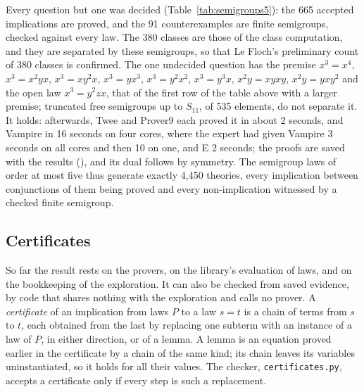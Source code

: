 \documentclass[11pt,a4paper]{article}
\theoremstyle{definition}
\theoremstyle{remark}
\newcommand{\code}[1]{\texttt{#1}}
\begin{document}
Every question but one was decided (Table~\ref{tab:semigroups5}): the 665 accepted implications are proved, and the 91 counterexamples are finite semigroups, checked against every law. The 380 classes are those of the class computation, and they are separated by these semigroups, so that Le Floch's preliminary count of 380 classes is confirmed. The one undecided question has the premise $x^3 = x^4$, $x^3 = x^2yx$, $x^3 = xy^2x$, $x^3 = yx^3$, $x^3 = y^2x^2$, $x^3 = y^3x$, $x^2y = xyxy$, $x^2y = yxy^2$ and the open law $x^3 = y^2zx$, that of the first row of the table above with a larger premise; truncated free semigroups up to $S_{11}$, of 535 elements, do not separate it. It holds: afterwards, Twee and Prover9 each proved it in about 2 seconds, and Vampire in 16 seconds on four cores, where the expert had given Vampire 3 seconds on all cores and then 10 on one, and E 2 seconds; the proofs are saved with the results (), and its dual follows by symmetry. The semigroup laws of order at most five thus generate exactly 4,450 theories, every implication between conjunctions of them being proved and every non-implication witnessed by a checked finite semigroup.

\subsection{Certificates}\label{sec:certificates}

So far the result rests on the provers, on the library's evaluation of laws, and on the bookkeeping of the exploration. It can also be checked from saved evidence, by code that shares nothing with the exploration and calls no prover. A \emph{certificate} of an implication from laws $P$ to a law $s = t$ is a chain of terms from $s$ to $t$, each obtained from the last by replacing one subterm with an instance of a law of $P$, in either direction, or of a lemma. A lemma is an equation proved earlier in the certificate by a chain of the same kind; its chain leaves its variables uninstantiated, so it holds for all their values. The checker, \code{certificates.py}, accepts a certificate only if every step is such a replacement.
\end{document}
